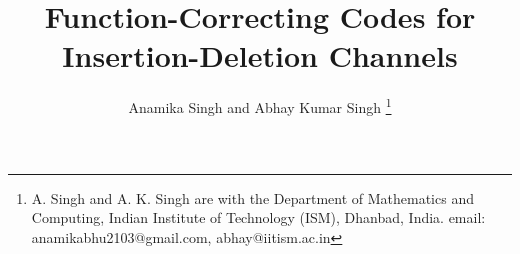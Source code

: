 \documentclass[11 pt]{article}
\numberwithin{equation}{section}
\begin{document}
\title{Function-Correcting Codes for Insertion-Deletion Channels}
%
%
%

\author{ 
        Anamika Singh and
        Abhay Kumar Singh%
\thanks{ A. Singh and A. K. Singh are with the Department of Mathematics and Computing, Indian Institute of Technology (ISM), Dhanbad, India. email: anamikabhu2103@gmail.com, abhay@iitism.ac.in}}%


% 
%




% 
\end{document}
